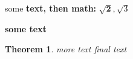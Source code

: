 \documentclass{amsart}
\newtheorem{theorem}{Theorem}
\begin{document}
{some \bfseries text, then math:} $\mathbf{\sqrt{2}}, \sqrt{3}$

{\bfseries some text}
\begin{theorem}
    more text final text
\end{theorem}
\end{document}
